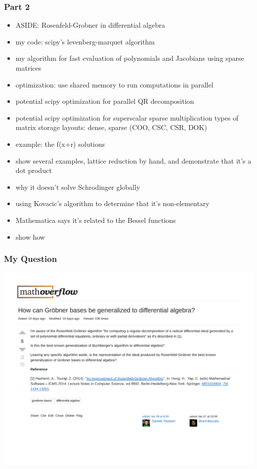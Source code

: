 \documentclass{beamer}
\begin{document}
\begin{frame}
\frametitle{Part 2}

\begin{itemize}
\item ASIDE: Rosenfeld-Grobner in differential algebra
\item my code: scipy's levenberg-marquet algorithm
\item my algorithm for fast evaluation of polynomials and Jacobians using sparse matrices
\item optimization: use shared memory to run computations in parallel
\item potential scipy optimization for parallel QR decomposition
\item potential scipy optimization for superscalar sparse multiplication
     types of matrix storage layouts: dense, sparse (COO, CSC, CSR, DOK)

\item example: the f(x+r) solutions
\item show several examples, lattice reduction by hand, and demonstrate that it's a dot product
\item why it doesn't solve Schrodinger globally
\item using Kovacic's algorithm to determine that it's non-elementary
\item Mathematica says it's related to the Bessel functions
\item show how
\end{itemize}
\end{frame}

\begin{frame}
\frametitle{My Question}
\includegraphics[width=\textwidth]{myquestion.pdf}
\end{frame}
\end{document}
